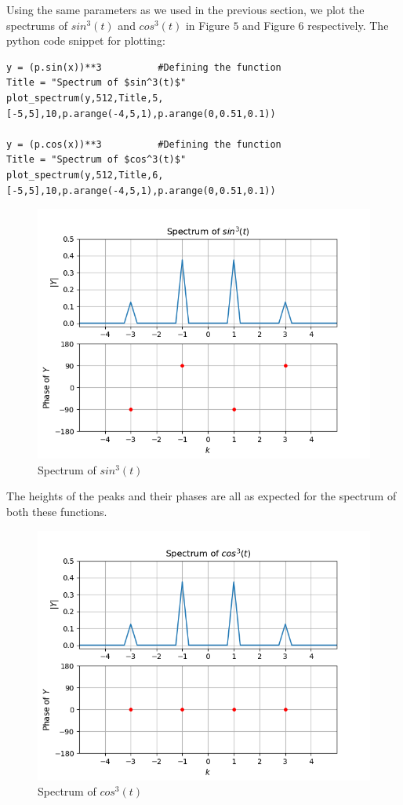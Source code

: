 \documentclass[11pt, a4paper]{article}
\begin{document}
    Using the same parameters as we used in the previous section, we plot the spectrums of $sin^3(t)$ and $cos^3(t)$ in Figure $5$ and Figure $6$ respectively. The python code snippet for plotting:
    \begin{verbatim}
y = (p.sin(x))**3          #Defining the function
Title = "Spectrum of $sin^3(t)$"
plot_spectrum(y,512,Title,5,[-5,5],10,p.arange(-4,5,1),p.arange(0,0.51,0.1))

y = (p.cos(x))**3          #Defining the function
Title = "Spectrum of $cos^3(t)$"
plot_spectrum(y,512,Title,6,[-5,5],10,p.arange(-4,5,1),p.arange(0,0.51,0.1))
    \end{verbatim}
    \begin{figure}[!h]
        \centering
        \includegraphics[scale = 0.7]{Figure 5.png}
        \caption{Spectrum of $sin^3(t)$}
        \label{fig:Figure 5}
    \end{figure}
    The heights of the peaks and their phases are all as expected for the spectrum of both these functions.
    \begin{figure}[!h]
        \centering
        \includegraphics[scale = 0.7]{Figure 6.png}
        \caption{Spectrum of $cos^3(t)$}
        \label{fig:Figure 6}
    \end{figure}
\end{document}
